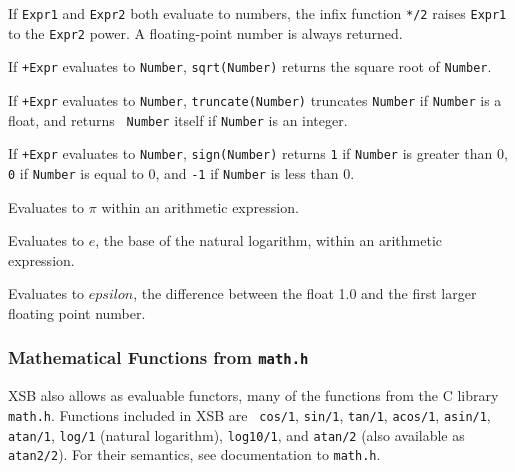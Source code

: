 \begin{description}
%
If {\tt Expr1} and {\tt Expr2} both evaluate to numbers, the infix
function {\tt **/2} raises {\tt Expr1} to the {\tt Expr2} power.  A
floating-point number is always returned.

%
If {\tt +Expr} evaluates to {\tt Number}, {\tt sqrt(Number)}
returns the square root of {\tt Number}.

%
If {\tt +Expr} evaluates to {\tt Number}, {\tt truncate(Number)}
truncates {\tt Number} if {\tt Number} is a float, and returns {\tt
  Number} itself if {\tt Number} is an integer.

%
If {\tt +Expr} evaluates to {\tt Number}, {\tt sign(Number)} returns
{\tt 1} if {\tt Number} is greater than 0, {\tt 0} if {\tt Number} is
equal to 0, and {\tt -1} if {\tt Number} is less than 0.

% 
Evaluates to $\pi$ within an arithmetic expression.

% 
Evaluates to $e$, the base of the natural logarithm, within an
arithmetic expression.

% 
Evaluates to $epsilon$, the difference between the float 1.0 and 
the first larger floating point number.

\end{description}

\subsubsection{Mathematical Functions from {\tt math.h}}
  
  
  

XSB also allows as evaluable functors, many of the functions from the
C library {\tt math.h}.  Functions included in XSB \version{} are {\tt
  cos/1}, {\tt sin/1}, {\tt tan/1}, {\tt acos/1}, {\tt asin/1}, {\tt
  atan/1}, {\tt log/1} (natural logarithm), {\tt log10/1}, and 
  {\tt atan/2} (also available as {\tt atan2/2}).  For
  their semantics, see documentation to {\tt math.h}.

